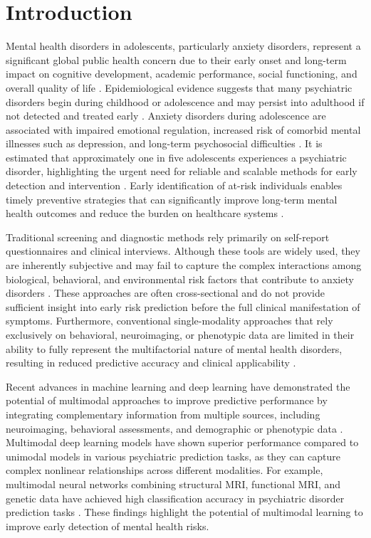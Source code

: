 \documentclass[10pt,letterpaper]{article}
\begin{document}
\section*{Introduction}
Mental health disorders in adolescents, particularly anxiety disorders, represent a significant global public health concern due to their early onset and long-term impact on cognitive development, academic performance, social functioning, and overall quality of life \cite{ref36,ref37}. Epidemiological evidence suggests that many psychiatric disorders begin during childhood or adolescence and may persist into adulthood if not detected and treated early \cite{ref36,ref38}. Anxiety disorders during adolescence are associated with impaired emotional regulation, increased risk of comorbid mental illnesses such as depression, and long-term psychosocial difficulties \cite{ref17}. It is estimated that approximately one in five adolescents experiences a psychiatric disorder, highlighting the urgent need for reliable and scalable methods for early detection and intervention \cite{ref37}. Early identification of at-risk individuals enables timely preventive strategies that can significantly improve long-term mental health outcomes and reduce the burden on healthcare systems \cite{ref38}.

Traditional screening and diagnostic methods rely primarily on self-report questionnaires and clinical interviews. Although these tools are widely used, they are inherently subjective and may fail to capture the complex interactions among biological, behavioral, and environmental risk factors that contribute to anxiety disorders \cite{ref11,ref13}. These approaches are often cross-sectional and do not provide sufficient insight into early risk prediction before the full clinical manifestation of symptoms. Furthermore, conventional single-modality approaches that rely exclusively on behavioral, neuroimaging, or phenotypic data are limited in their ability to fully represent the multifactorial nature of mental health disorders, resulting in reduced predictive accuracy and clinical applicability \cite{ref40}.

Recent advances in machine learning and deep learning have demonstrated the potential of multimodal approaches to improve predictive performance by integrating complementary information from multiple sources, including neuroimaging, behavioral assessments, and demographic or phenotypic data \cite{ref1,ref25}. Multimodal deep learning models have shown superior performance compared to unimodal models in various psychiatric prediction tasks, as they can capture complex nonlinear relationships across different modalities. For example, multimodal neural networks combining structural MRI, functional MRI, and genetic data have achieved high classification accuracy in psychiatric disorder prediction tasks \cite{ref25,ref39}. These findings highlight the potential of multimodal learning to improve early detection of mental health risks.
\end{document}
